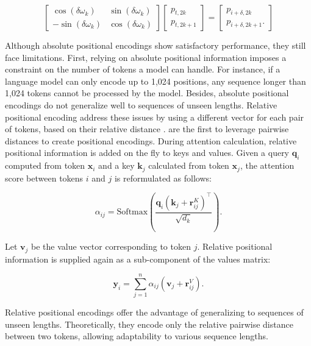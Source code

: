 \begin{equation}
    \begin{bmatrix}
        \cos(\delta \omega_k)  & \sin(\delta \omega_k) \\
        -\sin(\delta \omega_k) & \cos(\delta \omega_k)
    \end{bmatrix}
    \begin{bmatrix}
        p_{t, 2k}   \\
        p_{t, 2k+1}
    \end{bmatrix}
    = \begin{bmatrix}
        p_{i + \delta, 2k}   \\
        p_{i + \delta, 2k+1}.
    \end{bmatrix}
\end{equation}

Although absolute positional encodings show satisfactory performance, they still face limitations. First, relying on absolute positional information imposes a constraint on the number of tokens a model can handle. For instance, if a language model can only encode up to 1,024 positions, any sequence longer than 1,024 tokens cannot be processed by the model. Besides, absolute positional encodings do not generalize well to sequences of unseen lengths. Relative positional encoding address these issues by using a different vector for each pair of tokens, based on their relative distance \citep{shaw2018self, huang2018music, ke2020rethinking}.  \citet{shaw2018self} are the first to leverage pairwise distances to create positional encodings. During attention calculation, relative positional information is added on the fly to keys and values. Given a query $\bm{q}_i$ computed from token $\bm{x}_i$ and a key $\bm{k}_j$ calculated from token $\bm{x}_j$, the attention score between tokens $i$ and $j$ is reformulated as follows:

\begin{equation}
    \alpha_{ij} = \mathrm{Softmax}\left(\frac{\bm{q}_i (\bm{k}_j + \bm{r}^K_{ij})^{\top}}{\sqrt{d_k}}\right).
\end{equation}

Let $\bm{v}_j$ be the value vector corresponding to token $j$. Relative positional information is supplied again as a sub-component of the values matrix:

\begin{equation}
    \bm{y}_i = \sum_{j=1}^n \alpha_{ij} (\bm{v}_j + \bm{r}^V_{ij}).
\end{equation}

Relative positional encodings offer the advantage of generalizing to sequences of unseen lengths. Theoretically, they encode only the relative pairwise distance between two tokens, allowing adaptability to various sequence lengths.

